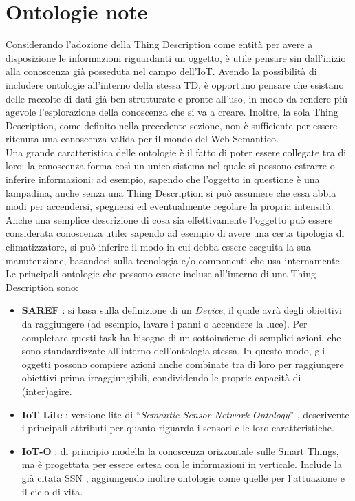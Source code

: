 \documentclass[12pt,a4paper,openright,oneside]{report}
\newcommand{\quotes}[1]{``#1''}
\begin{document}
\section{Ontologie note}
\label{sec:ontologie_note}
Considerando l'adozione della Thing Description come entità per avere a disposizione le informazioni riguardanti un oggetto, è utile pensare sin dall'inizio alla conoscenza già posseduta nel campo dell'IoT. Avendo la possibilità di includere ontologie all'interno della stessa TD, è opportuno pensare che esistano delle raccolte di dati già ben strutturate e pronte all'uso, in modo da rendere più agevole l'esplorazione della conoscenza che si va a creare. Inoltre, la sola Thing Description, come definito nella precedente sezione, non è sufficiente per essere ritenuta una conoscenza valida per il mondo del Web Semantico.\\

Una grande caratteristica delle ontologie è il fatto di poter essere collegate tra di loro: la conoscenza forma così un unico sistema nel quale si possono estrarre o inferire informazioni: ad esempio, sapendo che l'oggetto in questione è una lampadina, anche senza una Thing Description si può assumere che essa abbia modi per accendersi, spegnersi ed eventualmente regolare la propria intensità. Anche una semplice descrizione di cosa sia effettivamente l'oggetto può essere considerata conoscenza utile: sapendo ad esempio di avere una certa tipologia di climatizzatore, si può inferire il modo in cui debba essere eseguita la sua manutenzione, basandosi sulla tecnologia e/o componenti che usa internamente.\\

Le principali ontologie che possono essere incluse all'interno di una Thing Description sono:
\begin{itemize}
	\item \textbf{SAREF} \cite{saref}: si basa sulla definizione di un \textit{Device}, il quale avrà degli obiettivi da raggiungere (ad esempio, lavare i panni o accendere la luce). Per completare questi task ha bisogno di un sottoinsieme di semplici azioni, che sono standardizzate all'interno dell'ontologia stessa. In questo modo, gli oggetti possono compiere azioni anche combinate tra di loro per raggiungere obiettivi prima irraggiungibili, condividendo le proprie capacità di (inter)agire.
	
	\item \textbf{IoT Lite} \cite{iot-lite}: versione lite di \quotes{\textit{Semantic Sensor Network Ontology}} \cite{ssno}, descrivente i principali attributi per quanto riguarda i sensori e le loro caratteristiche.
	
	\item \textbf{IoT-O} \cite{ioto}\cite{iot-paper}: di principio modella la conoscenza orizzontale sulle Smart Things, ma è progettata per essere estesa con le informazioni in verticale. Include la già citata SSN \cite{ssno}, aggiungendo inoltre ontologie come quelle per l'attuazione e il ciclo di vita.

\end{itemize}
\end{document}
